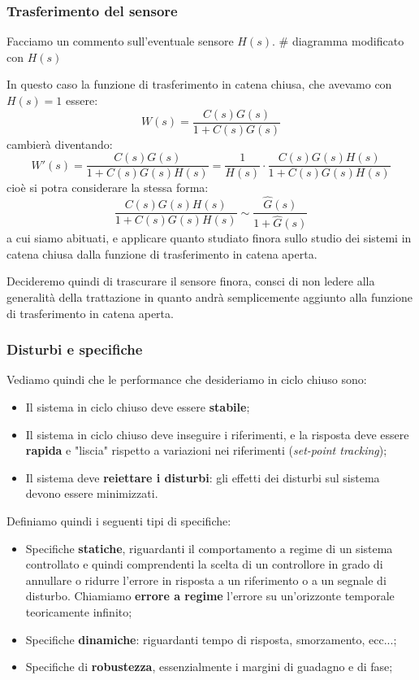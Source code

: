\documentclass[a4paper,11pt]{article}
\begin{document}
\subsubsection{Trasferimento del sensore}
Facciamo un commento sull'eventuale sensore $H(s)$.
# diagramma modificato con $H(s)$

In questo caso la funzione di trasferimento in catena chiusa, che avevamo con $H(s) = 1$ essere:
$$
W(s) = \frac{C(s) G(s)}{1 + C(s) G(s)}
$$
cambierà diventando:
$$
W'(s) = \frac{C(s) G(s)}{1 + C(s) G(s) H(s)} = \frac{1}{H(s)} \cdot \frac{C(s) G(s) H(s)}{1 + C(s) G(s) H(s)}
$$
cioè si potra considerare la stessa forma:
$$
\frac{C(s) G(s) H(s)}{1 + C(s) G(s) H(s)} \sim \frac{\hat{G}(s)}{1 + \hat{G}(s)}
$$
a cui siamo abituati, e applicare quanto studiato finora sullo studio dei sistemi in catena chiusa dalla funzione di trasferimento in catena aperta.

Decideremo quindi di trascurare il sensore finora, consci di non ledere alla generalità della trattazione in quanto andrà semplicemente aggiunto alla funzione di trasferimento in catena aperta.

\subsubsection{Disturbi e specifiche}
Vediamo quindi che le performance che desideriamo in ciclo chiuso sono:
\begin{itemize}
	\item Il sistema in ciclo chiuso deve essere \textbf{stabile};
	\item Il sistema in ciclo chiuso deve inseguire i riferimenti, e la risposta deve essere \textbf{rapida} e "liscia" rispetto a variazioni nei riferimenti (\textit{set-point tracking});
	\item Il sistema deve \textbf{reiettare i disturbi}: gli effetti dei disturbi sul sistema devono essere minimizzati.
\end{itemize}

Definiamo quindi i seguenti tipi di specifiche:
\begin{itemize}
	\item Specifiche \textbf{statiche}, riguardanti il comportamento a regime di un sistema controllato e quindi comprendenti la scelta di un controllore in grado di annullare o ridurre l'errore in risposta a un riferimento o a un segnale di disturbo. Chiamiamo \textbf{errore a regime} l'errore su un'orizzonte temporale teoricamente infinito;
	\item Specifiche \textbf{dinamiche}: riguardanti tempo di risposta, smorzamento, ecc...;
	\item Specifiche di \textbf{robustezza}, essenzialmente i margini di guadagno e di fase;
\end{itemize}
\end{document}
